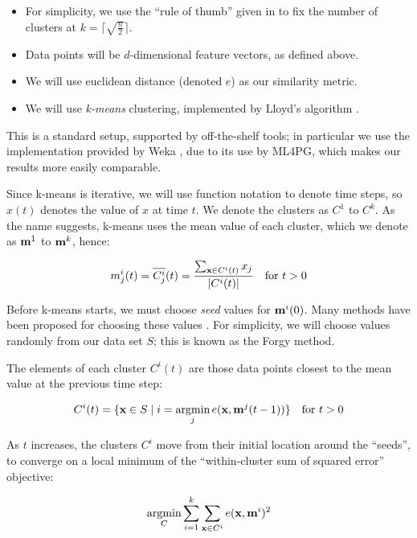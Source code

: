 \begin{itemize}
  \item For simplicity, we use the ``rule of thumb'' given in \citep[pp. 365]{mardia1979multivariate} to fix the number of clusters at $k = \lceil \sqrt{\frac{n}{2}} \rceil$.
  \item Data points will be $d$-dimensional feature vectors, as defined above.
  \item We will use euclidean distance (denoted $e$) as our similarity metric.
  \item We will use \emph{k-means} clustering, implemented by Lloyd's algorithm \citep{lloyd1982least}.
\end{itemize}

This is a standard setup, supported by off-the-shelf tools; in particular we use the implementation provided by Weka \citep{Holmes.Donkin.Witten:1994}, due to its use by ML4PG, which makes our results more easily comparable.

Since k-means is iterative, we will use function notation to denote time steps, so $x(t)$ denotes the value of $x$ at time $t$. We denote the clusters as $C^1$ to $C^k$. As the name suggests, k-means uses the mean value of each cluster, which we denote as $\mathbf{m}^1$ to $\mathbf{m}^k$, hence:

\begin{equation*}
  m^i_j(t) = \overline{C^i_j}(t) = \frac{\sum_{\mathbf{x} \in C^i(t)} x_j}{|C^i(t)|} \quad \text{for $t > 0$}
\end{equation*}

Before k-means starts, we must choose \emph{seed} values for $\mathbf{m}^i(0)$. Many methods have been proposed for choosing these values \citep{arthur2007k}. For simplicity, we will choose values randomly from our data set $S$; this is known as the Forgy method.

The elements of each cluster $C^i(t)$ are those data points closest to the mean value at the previous time step:

\begin{equation*}
  C^i(t) = \{ \vect{x} \in S \mid i = \argmin\limits_j e(\vect{x}, \vect{m}^j(t-1)) \} \quad \text{for $t > 0$}
\end{equation*}

As $t$ increases, the clusters $C^i$ move from their initial location around the ``seeds'', to converge on a local minimum of the ``within-cluster sum of squared error'' objective:

\begin{equation} \label{eq:kmeansobjective}
  \argmin\limits_C \sum_{i=1}^k \sum_{\vect{x} \in C^i} e(\vect{x}, \vect{m}^i)^2
\end{equation}
